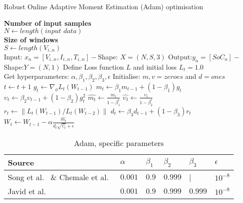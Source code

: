 \begin{algorithm}
  \caption{Robust Online Adaptive Moment Estimation (Adam) optimisation}
  \begin{algorithmic}[1]
    \STATE \textbf{Number of input samples} \\ $N\gets length(\textit{input data})$\\
    \STATE \textbf{Size of windows} \\ $S\gets length(V_{i..n})$\\
    \STATE Input: $x_n = [V_{i..n}, I_{i..n}, T_{i..n}] - $Shape: $X = (N, S, 3)$
    \STATE Output:$y_n = [SoC_{n}] - $Shape:$Y = (N, 1)$
    \STATE Define Loss function $L$ and initial loss $L_t = 1.0$ \\
           Get hyperparameters: $\alpha, \beta_1, \beta_2, \beta_3, \epsilon$
    \STATE Initialise: $m,v=zeroes$ and $d=ones$ \\
    \STATE $t \gets t+1$
    \STATE $g_t \gets \nabla_\phi L_t (W_{t-1})$ 
    \STATE $m_t \gets \beta_1 m_{t-1}+(1-\beta_1) g_t $ 
    \STATE $\upsilon_t \gets \beta_2 \upsilon_{t-1}+ \left(1-\beta_2 \right)g^2_t $ 
    \STATE $\hat{m_t} \gets \frac{m_t}{1-\beta^t_1}$ 
    \STATE $\hat{\upsilon_t} \gets \frac{\upsilon_t}{1-\beta^t_2} $ 
    \STATE $r_t \gets \parallel L_t\left(W_{t-1}\right)/L_t\left(W_{t-2}\right) \parallel $ 
    \STATE $d_t \gets \beta_3 d_{t-1}+\left(1-\beta_3\right)r_t $ 
    \STATE $W_t \gets W_{t-1}- \alpha \frac{\hat{m_t}}{d_t\sqrt{\hat{\upsilon_t}}+\epsilon} $ 
    \ENDWHILE
  \end{algorithmic}
  \label{alg:RoAdam}
\end{algorithm}
\begin{table}[htbp]
    \centering
    \caption{Adam, specific parameters}
    \label{tab:adam-params}
    \begin{tabular}{ p{6.0cm} p{1.5cm} p{1.5cm} p{1.5cm} p{1.5cm} p{1.5cm}  }
        \hline
        Source     & $\alpha$ & $\beta_1 $ & $\beta_2$ & $\beta_3$ &  $\epsilon$ \\
        \hline
        Song et al.~\cite{song_lithium-ion_2018} \& Chemale et al.~\cite{Chemali2017}
                & $0.001$ & $0.9$ & $0.999$ & |   &$10^{-8}$ \\%
        Javid et al.~\cite{javid_adaptive_2020}
                & $0.001$ & $0.9$ & $0.999$ & $0.999$ &$10^{-8}$ \\%
        \hline
    \end{tabular}
\end{table}


